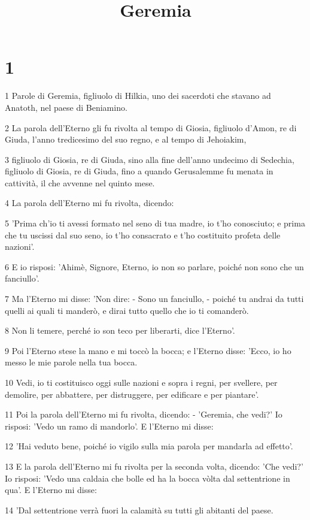 

\title{Geremia}


\chapter{1}

\par 1 Parole di Geremia, figliuolo di Hilkia, uno dei sacerdoti che stavano ad Anatoth, nel paese di Beniamino.
\par 2 La parola dell'Eterno gli fu rivolta al tempo di Giosia, figliuolo d'Amon, re di Giuda, l'anno tredicesimo del suo regno, e al tempo di Jehoiakim,
\par 3 figliuolo di Giosia, re di Giuda, sino alla fine dell'anno undecimo di Sedechia, figliuolo di Giosia, re di Giuda, fino a quando Gerusalemme fu menata in cattività, il che avvenne nel quinto mese.
\par 4 La parola dell'Eterno mi fu rivolta, dicendo:
\par 5 'Prima ch'io ti avessi formato nel seno di tua madre, io t'ho conosciuto; e prima che tu uscissi dal suo seno, io t'ho consacrato e t'ho costituito profeta delle nazioni'.
\par 6 E io risposi: 'Ahimè, Signore, Eterno, io non so parlare, poiché non sono che un fanciullo'.
\par 7 Ma l'Eterno mi disse: 'Non dire: - Sono un fanciullo, - poiché tu andrai da tutti quelli ai quali ti manderò, e dirai tutto quello che io ti comanderò.
\par 8 Non li temere, perché io son teco per liberarti, dice l'Eterno'.
\par 9 Poi l'Eterno stese la mano e mi toccò la bocca; e l'Eterno disse: 'Ecco, io ho messo le mie parole nella tua bocca.
\par 10 Vedi, io ti costituisco oggi sulle nazioni e sopra i regni, per svellere, per demolire, per abbattere, per distruggere, per edificare e per piantare'.
\par 11 Poi la parola dell'Eterno mi fu rivolta, dicendo: - 'Geremia, che vedi?' Io risposi: 'Vedo un ramo di mandorlo'. E l'Eterno mi disse:
\par 12 'Hai veduto bene, poiché io vigilo sulla mia parola per mandarla ad effetto'.
\par 13 E la parola dell'Eterno mi fu rivolta per la seconda volta, dicendo: 'Che vedi?' Io risposi: 'Vedo una caldaia che bolle ed ha la bocca vòlta dal settentrione in qua'. E l'Eterno mi disse:
\par 14 'Dal settentrione verrà fuori la calamità su tutti gli abitanti del paese.
